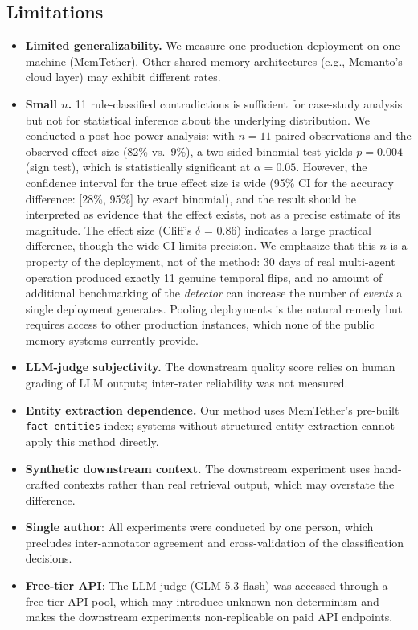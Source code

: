 \documentclass{article}
\begin{document}
\subsection{Limitations}
\begin{itemize}
\item \textbf{Limited generalizability.} We measure one production deployment on one machine (MemTether). Other shared-memory architectures (e.g., Memanto's cloud layer) may exhibit different rates.
\item \textbf{Small $n$.} 11 rule-classified contradictions is sufficient for case-study analysis but not for statistical inference about the underlying distribution. We conducted a post-hoc power analysis: with $n{=}11$ paired observations and the observed effect size (82\% vs.\ 9\%), a two-sided binomial test yields $p{=}0.004$ (sign test), which is statistically significant at $\alpha{=}0.05$. However, the confidence interval for the true effect size is wide (95\% CI for the accuracy difference: [28\%, 95\%] by exact binomial), and the result should be interpreted as evidence that the effect exists, not as a precise estimate of its magnitude. The effect size (Cliff's $\delta$ = 0.86) indicates a large practical difference, though the wide CI limits precision. We emphasize that this $n$ is a property of the deployment, not of the method: 30 days of real multi-agent operation produced exactly 11 genuine temporal flips, and no amount of additional benchmarking of the \emph{detector} can increase the number of \emph{events} a single deployment generates. Pooling deployments is the natural remedy but requires access to other production instances, which none of the public memory systems currently provide.
\item \textbf{LLM-judge subjectivity.} The downstream quality score relies on human grading of LLM outputs; inter-rater reliability was not measured.
\item \textbf{Entity extraction dependence.} Our method uses MemTether's pre-built \texttt{fact\_entities} index; systems without structured entity extraction cannot apply this method directly.
\item \textbf{Synthetic downstream context.} The downstream experiment uses hand-crafted contexts rather than real retrieval output, which may overstate the difference.
\item \textbf{Single author}: All experiments were conducted by one person, which precludes inter-annotator agreement and cross-validation of the classification decisions.
\item \textbf{Free-tier API}: The LLM judge (GLM-5.3-flash) was accessed through a free-tier API pool, which may introduce unknown non-determinism and makes the downstream experiments non-replicable on paid API endpoints.

\end{itemize}
\end{document}
